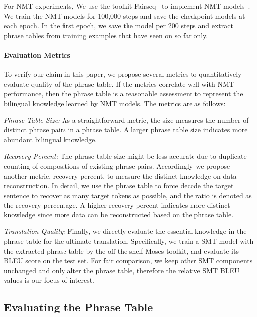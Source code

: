 \documentclass[11pt,a4paper]{article}
\begin{document}
For NMT experiments, We use the toolkit Fairseq~\cite{ott:2019:naacl} to implement NMT models~\cite{Vaswani:2017:NIPS}. We train the NMT models for 100,000 steps and save the checkpoint models at each epoch. In the first epoch, we save the model per 200 steps and extract phrase tables from training examples that have seen on so far only.


\paragraph{Evaluation Metrics} To verify our claim in this paper, we propose several metrics to quantitatively evaluate quality of the phrase table. If the metrics correlate well with NMT performance, then the phrase table is a reasonable assessment to represent the bilingual knowledge learned by NMT models.
The metrics are as follows:

\vspace{3pt}
\noindent \textit{Phrase Table Size:} As a straightforward metric, the size measures the number of distinct phrase pairs in a phrase table. A larger phrase table size indicates more abundant bilingual knowledge.

\vspace{3pt}
\noindent \textit{Recovery Percent:} The phrase table size might be less accurate due to duplicate counting of compositions of existing phrase pairs. Accordingly, we propose another metric, recovery percent, to measure the distinct knowledge on data reconstruction. In detail, we use the phrase table to force decode the target sentence to recover as many target tokens as possible, and the ratio is denoted as the recovery percentage. A higher recovery percent indicates more distinct knowledge since more data can be reconstructed based on the phrase table.

\vspace{3pt}
\noindent \textit{Translation Quality:} Finally, we directly evaluate the essential knowledge in the phrase table for the ultimate translation. Specifically, we train a SMT model with the extracted phrase table by the off-the-shelf Moses toolkit, and evaluate its BLEU score on the test set. For fair comparison, we keep other SMT components unchanged and only alter the phrase table, therefore the relative SMT BLEU values is our focus of interest.





\subsection{Evaluating the Phrase Table}
\label{section:evaluate_bilingual_knowledge}
\end{document}

